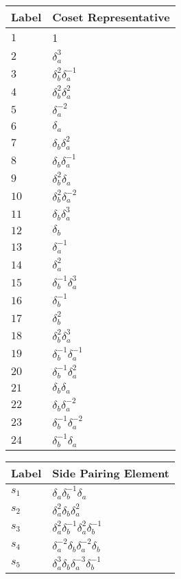 \documentclass{article}
\begin{document}

\begin{center}
\begin{tabular}{ll}
\toprule
Label & Coset Representative\\
\midrule
$1$ & 1 \\
$2$ & $\delta_a^{3}$ \\
$3$ & $\delta_b^{2}\delta_a^{-1}$ \\
$4$ & $\delta_b^{2}\delta_a^{2}$ \\
$5$ & $\delta_a^{-2}$ \\
$6$ & $\delta_a^{}$ \\
$7$ & $\delta_b^{}\delta_a^{2}$ \\
$8$ & $\delta_b^{}\delta_a^{-1}$ \\
$9$ & $\delta_b^{2}\delta_a^{}$ \\
$10$ & $\delta_b^{2}\delta_a^{-2}$ \\
$11$ & $\delta_b^{}\delta_a^{3}$ \\
$12$ & $\delta_b^{}$ \\
$13$ & $\delta_a^{-1}$ \\
$14$ & $\delta_a^{2}$ \\
$15$ & $\delta_b^{-1}\delta_a^{3}$ \\
$16$ & $\delta_b^{-1}$ \\
$17$ & $\delta_b^{2}$ \\
$18$ & $\delta_b^{2}\delta_a^{3}$ \\
$19$ & $\delta_b^{-1}\delta_a^{-1}$ \\
$20$ & $\delta_b^{-1}\delta_a^{2}$ \\
$21$ & $\delta_b^{}\delta_a^{}$ \\
$22$ & $\delta_b^{}\delta_a^{-2}$ \\
$23$ & $\delta_b^{-1}\delta_a^{-2}$ \\
$24$ & $\delta_b^{-1}\delta_a^{}$ \\
\bottomrule
\end{tabular}
\hfill
\begin{tabular}{ll}
\toprule
Label & Side Pairing Element\\
\midrule
$s_{1}$ & $\delta_a^{}\delta_b^{-1}\delta_a^{}$ \\
$s_{2}$ & $\delta_a^{2}\delta_b^{}\delta_a^{2}$ \\
$s_{3}$ & $\delta_a^{2}\delta_b^{-1}\delta_a^{2}\delta_b^{-1}$ \\
$s_{4}$ & $\delta_a^{-2}\delta_b^{}\delta_a^{-2}\delta_b^{}$ \\
$s_{5}$ & $\delta_a^{3}\delta_b^{}\delta_a^{-3}\delta_b^{-1}$ \\

\end{tabular}
\end{center}
\end{document}
